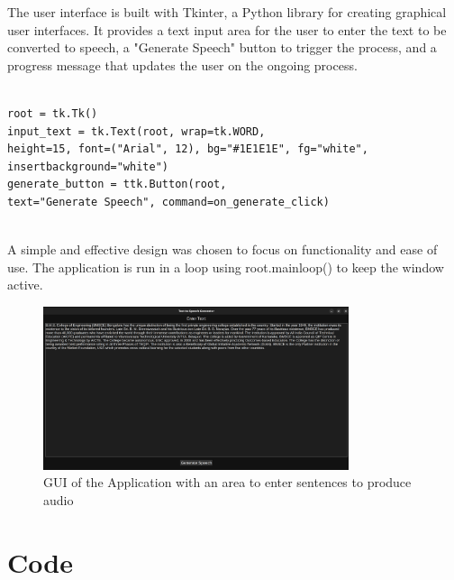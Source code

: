 \documentclass[12pt, a4paper]{article}
\begin{document}
The user interface is built with Tkinter, a Python library for creating graphical user interfaces. It provides a text input area for the user to enter the text to be converted to speech, a "Generate Speech" button to trigger the process, and a progress message that updates the user on the ongoing process.

\begin{verbatim}

root = tk.Tk()
input_text = tk.Text(root, wrap=tk.WORD, 
height=15, font=("Arial", 12), bg="#1E1E1E", fg="white", insertbackground="white")
generate_button = ttk.Button(root, 
text="Generate Speech", command=on_generate_click)


\end{verbatim}

A simple and effective design was chosen to focus on functionality and ease of use. The application is run in a loop using root.mainloop() to keep the window active.

\begin{figure}[h!]
\centering
\includegraphics[width=0.8\textwidth]{figures/gui.png}
\caption{GUI of the Application with an area to enter sentences to produce audio}
\label{fig:test_results}
\end{figure}

\section{Code}
\end{document}
